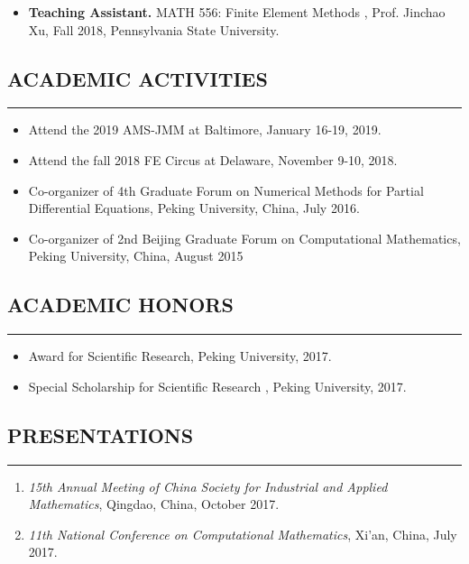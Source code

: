\documentclass[10pt,a4]{article}
\begin{document}
\begin{small}
\begin{itemize}
\item {\bf Teaching Assistant.} MATH 556: Finite Element Methods , Prof. Jinchao Xu, Fall 2018, Pennsylvania State University.

\end{itemize}
\subsection*{ACADEMIC ACTIVITIES}
\hrule
\vspace{0.2cm}
\begin{itemize}
	\item Attend the 2019 AMS-JMM at Baltimore, January 16-19, 2019.
	\item Attend the fall 2018 FE Circus at Delaware, November 9-10, 2018.
	\item Co-organizer of 4th Graduate Forum on Numerical Methods for Partial Differential Equations, Peking University, China, July 2016.
	\item Co-organizer of 2nd Beijing Graduate Forum on Computational Mathematics, Peking University, China, August 2015
\end{itemize}
 
\subsection*{ACADEMIC HONORS}
\hrule
\vspace{0.2cm}
\begin{itemize}
	\item Award for Scientific Research, Peking University, 2017.
	\item Special Scholarship for Scientific Research , Peking University, 2017.
\end{itemize}
 
\subsection*{PRESENTATIONS}
\hrule
\vspace{0.2cm}

\begin{enumerate}
    \item 
       {\it 15th Annual Meeting of China Society for Industrial and Applied Mathematics}, Qingdao, China, October 2017. 

    \item  
       {\it 11th National Conference on Computational Mathematics}, Xi'an, China, July 2017. 


\end{enumerate}
\end{small}
\end{document}
